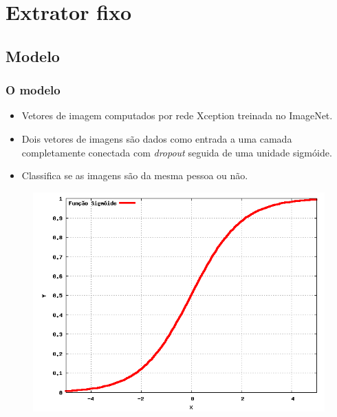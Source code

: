 \documentclass{beamer}
\begin{document}
\section{Extrator fixo}
\subsection{Modelo}
\begin{frame}
\frametitle{O modelo}
    \begin{itemize}
        \item Vetores de imagem computados por rede Xception treinada no ImageNet.
        \item Dois vetores de imagens são dados como entrada a uma camada completamente conectada com \textit{dropout} seguida de uma unidade sigmóide.
        \item Classifica se as imagens são da mesma pessoa ou não.
    \end{itemize}
    \begin{figure}
    \includegraphics[width=0.5\linewidth]{figs/sigmoide.png}
    \end{figure}
\end{frame}
\end{document}

